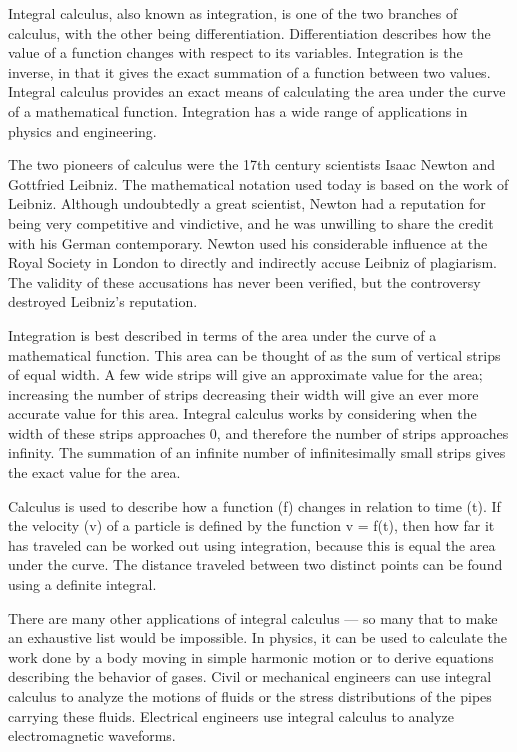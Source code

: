 Integral calculus, also known as integration, is one of the two branches of calculus, with the other being differentiation. Differentiation describes how the value of a function changes with respect to its variables. Integration is the inverse, in that it gives the exact summation of a function between two values. Integral calculus provides an exact means of calculating the area under the curve of a mathematical function. Integration has a wide range of applications in physics and engineering.

The two pioneers of calculus were the 17th century scientists Isaac Newton and Gottfried Leibniz. The mathematical notation used today is based on the work of Leibniz. Although undoubtedly a great scientist, Newton had a reputation for being very competitive and vindictive, and he was unwilling to share the credit with his German contemporary. Newton used his considerable influence at the Royal Society in London to directly and indirectly accuse Leibniz of plagiarism. The validity of these accusations has never been verified, but the controversy destroyed Leibniz's reputation.

Integration is best described in terms of the area under the curve of a mathematical function. This area can be thought of as the sum of vertical strips of equal width. A few wide strips will give an approximate value for the area; increasing the number of strips decreasing their width will give an ever more accurate value for this area. Integral calculus works by considering when the width of these strips approaches 0, and therefore the number of strips approaches infinity. The summation of an infinite number of infinitesimally small strips gives the exact value for the area.

Calculus is used to describe how a function (f) changes in relation to time (t). If the velocity (v) of a particle is defined by the function v = f(t), then how far it has traveled can be worked out using integration, because this is equal the area under the curve. The distance traveled between two distinct points can be found using a definite integral.

There are many other applications of integral calculus — so many that to make an exhaustive list would be impossible. In physics, it can be used to calculate the work done by a body moving in simple harmonic motion or to derive equations describing the behavior of gases. Civil or mechanical engineers can use integral calculus to analyze the motions of fluids or the stress distributions of the pipes carrying these fluids. Electrical engineers use integral calculus to analyze electromagnetic waveforms.
